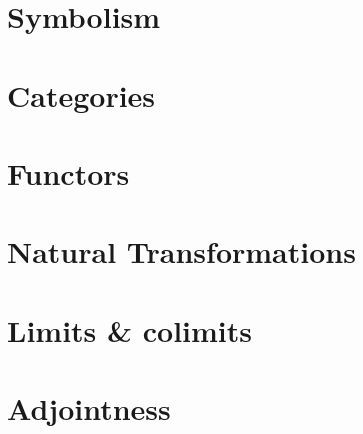 

\chapter{Symbolism}


\chapter{Categories}







\chapter{Functors}




\chapter{Natural Transformations}




\chapter{Limits \& colimits}




\chapter{Adjointness}




